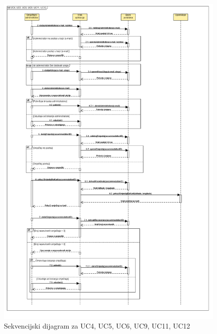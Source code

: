 				\begin{figure}[H]
					\includegraphics[scale=0.5]{slike/sd2.PNG} %
					\centering
					\caption{Sekvencijski dijagram za UC4, UC5, UC6, UC9, UC11, UC12}
					\label{fig:sd2} %
				\end{figure}
				
